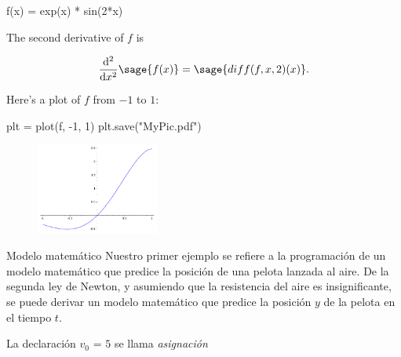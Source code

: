 \begin{frame}[fragile]
\frametitle{\insertsection}
\begin{block}{\insertsubsection}
\begin{sageblock}
f(x) = exp(x) * sin(2*x)
\end{sageblock}
The second derivative of $f$ is

\[
\frac{\mathrm{d}^{2}}{\mathrm{d}x^{2}} \sage{f(x)} =
\sage{diff(f, x, 2)(x)}.
\]

Here's a plot of $f$ from $-1$ to $1$:
\end{block}

\begin{sagesilent}
plt  = plot(f, -1, 1)
plt.save("MyPic.pdf")
\end{sagesilent}

\begin{figure}
\centering
\includegraphics[height=3cm]{MyPic.pdf}
\end{figure}

\end{frame}

\begin{frame}
\begin{block}{Modelo matemático}
Nuestro primer ejemplo se refiere a la programación de un modelo matemático que predice la posición de una pelota lanzada al aire. De la segunda ley de Newton, y asumiendo que la resistencia del aire es insignificante, se puede derivar un modelo matemático que predice la posición $y$ de la pelota en el tiempo $t$.
\end{block}

La declaración $v_0$ = $5$ se llama \emph{asignación}
\end{frame}